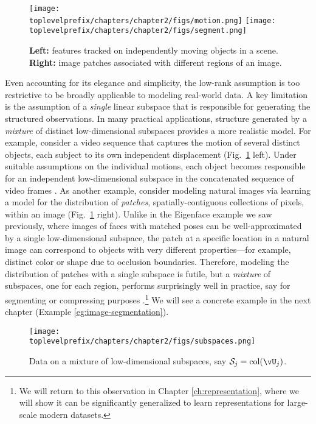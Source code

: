 \documentclass[../../book-main.tex]{subfiles}
\begin{document}
\begin{figure}
    \centering
    \texttt{[image: \\toplevelprefix/chapters/chapter2/figs/motion.png]} \hspace{5mm}
    \texttt{[image: \\toplevelprefix/chapters/chapter2/figs/segment.png]} 
    \caption{\textbf{Left:} features tracked on independently moving objects in a scene. \textbf{Right:} image patches associated with different regions of an image.}
    \label{fig:multiple-subspaces}
\end{figure}
Even accounting for its elegance and simplicity, the low-rank assumption is too restrictive to be broadly applicable to modeling real-world data. 
A key limitation is the assumption of a \textit{single} linear subspace that is responsible for generating the structured observations.
In many practical applications, structure generated by a \textit{mixture} of
distinct low-dimensional subspaces provides a more realistic model.
For example, consider a video sequence that captures the motion of several distinct objects, each subject to its own independent displacement (Fig.\ \ref{fig:multiple-subspaces} left). 
Under suitable assumptions on the individual motions, each object becomes responsible for an independent low-dimensional subspace in the concatenated sequence of video frames \cite{VidalR2004-ECCV}.
As another example, consider modeling natural images via learning a model for
the distribution of \textit{patches}, spatially-contiguous collections of
pixels, within an image (Fig.\ \ref{fig:multiple-subspaces} right). Unlike in
the Eigenface example we saw previously, where images of faces with matched
poses can be well-approximated by a single low-dimensional subspace, the patch
at a specific location in a natural image can correspond to objects with very
different properties---for example, distinct color or shape due to occlusion
boundaries. Therefore, modeling the distribution of patches with a single
subspace is futile, but a \textit{mixture} of subspaces, one for each region,
performs surprisingly well in practice, say for segmenting or compressing
purposes \cite{Mobahi-IJCV2011}.\footnote{We will return to this observation in
Chapter \ref{ch:representation}, where we will show it can be significantly
generalized to learn representations for large-scale modern datasets.} We will see a concrete example in the next chapter (Example \ref{eg:image-segmentation}).



\begin{figure}
    \centering
    \texttt{[image: \\toplevelprefix/chapters/chapter2/figs/subspaces.png]}
    \caption{Data on a mixture of low-dimensional subspaces, say $\mathcal{S}_j
    = \mathop{\mathrm{col}}(\vU_j)$.}
    \label{fig:subspaces}
\end{figure}
\end{document}

